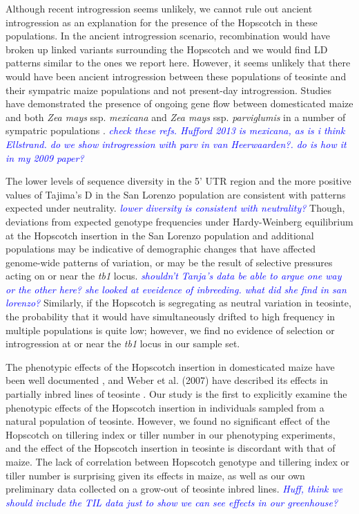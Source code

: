 \documentclass[12pt]{article}
\newcommand{\jri}[1]{\textcolor{blue}{ \emph{\scriptsize  #1}} }
\begin{document}
Although recent introgression seems unlikely, we cannot rule out ancient introgression as an explanation for the presence of the Hopscotch in these populations. In the ancient introgression scenario, recombination would have broken up linked variants surrounding the Hopscotch and we would find LD patterns similar to the ones we report here. However, it seems unlikely that there would have been ancient introgression between these populations of teosinte and their sympatric maize populations and not present-day introgression. Studies have demonstrated the presence of ongoing gene flow between domesticated maize and both \emph{Zea mays} ssp. \emph{mexicana} and \emph{Zea mays} ssp. \emph{parviglumis} in a number of sympatric populations \cite{Hufford et al 2013, Ellstrand et al 2007, van Heerwaarden et al 2011}. \jri{check these refs. Hufford 2013 is mexicana, as is i think Ellstrand. do we show introgression with parv in van Heerwaarden?. do is how it in my 2009 paper?}

The lower levels of sequence diversity in the 5' UTR region and the more positive values of Tajima's D in the San Lorenzo population are consistent with patterns expected under neutrality. \jri{lower diversity is consistent with neutrality?} Though, deviations from expected genotype frequencies under Hardy-Weinberg equilibrium at the Hopscotch insertion in the San Lorenzo population and additional populations may be indicative of demographic changes that have affected genome-wide patterns of variation, or may be the result of selective pressures acting on or near the \emph{tb1} locus. \jri{shouldn't Tanja's data be able to argue one way or the other here? she looked at eveidence of inbreeding. what did she find in san lorenzo?} Similarly, if the Hopscotch is segregating as neutral variation in teosinte, the probability that it would have simultaneously drifted to high frequency in multiple populations is quite low; however, we find no evidence of selection or introgression at or near the \emph{tb1} locus in our sample set.

The phenotypic effects of the Hopscotch insertion in domesticated maize have been well documented \cite{Clark et al 2006, Studer et al 2011}, and Weber et al. (2007) have described its effects in partially inbred lines of teosinte \cite{Weber et al 2007}. Our study is the first to explicitly examine the phenotypic effects of the Hopscotch insertion in individuals sampled from a natural population of teosinte. However, we found no significant effect of the Hopscotch on tillering index or tiller number in our phenotyping experiments, and the effect of the Hopscotch insertion in teosinte is discordant with that of maize. The lack of correlation between Hopscotch genotype and tillering index or tiller number is surprising given its effects in maize, as well as our own preliminary data collected on a grow-out of teosinte inbred lines. \jri{Huff, think we should include the TIL data just to show we can see effects in our greenhouse?}
\end{document}
